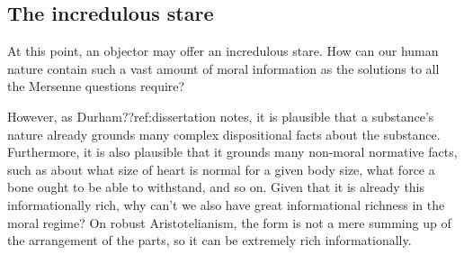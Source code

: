 \subsection{The incredulous stare}
At this point, an objector may offer an incredulous stare. How can our human nature contain such a vast amount of 
moral information as the solutions to all the Mersenne questions require? 

However, as Durham??ref:dissertation notes, it is plausible that a substance's nature already grounds many complex dispositional facts about the substance. Furthermore, it is also plausible that it grounds many non-moral normative facts,
such as about what size of heart is normal for a given body size, what force a bone ought to be able to withstand, and so on. Given that it is already this informationally rich, why can't we also have great informational richness in the moral regime? On robust Aristotelianism, the form is not a mere summing up of the arrangement of the parts, so it can be
extremely rich informationally.

